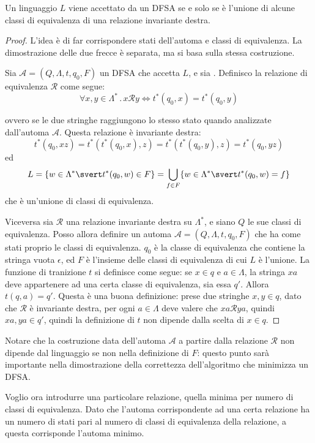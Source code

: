 \documentclass[12pt]{article}
\numberwithin{theorem}{subsection}
\begin{document}
\begin{theorem}\label{th:myhill-nerode}
	Un linguaggio $L$ viene accettato da un DFSA se e solo se è l'unione di alcune classi di equivalenza di una relazione invariante destra.
\end{theorem}
\begin{proof}
	L'idea è di far corrispondere stati dell'automa e classi di equivalenza. La dimostrazione delle due frecce è separata, ma si basa sulla stessa costruzione.
	
	Sia $\mathcal{A} = ( Q, \Lambda, t, q_0, F )$ un DFSA che accetta $L$, e sia . Definisco la relazione di equivalenza $\mathcal{R}$ come segue:
	\[
	\forall x, y \in \Lambda^* \,.\, x \mathcal{R} y \iff t^*(q_0, x) = t^*(q_0, y)
	\]
	
	ovvero se le due stringhe raggiungono lo stesso stato quando analizzate dall'automa $\mathcal{A}$. Questa relazione è invariante destra:
	\[
	t^*(q_0, xz) = t^*(t^*(q_0, x), z) = t^*(t^*(q_0, y), z) = t^*(q_0, yz)
	\]
	ed
	\[
	L = \lbrace w \in \Lambda^* \svert t^*(q_0, w) \in F \rbrace = \bigcup\limits_{f \in F} \lbrace w \in \Lambda^* \svert t^*(q_0, w) = f \rbrace
	\]
	che è un'unione di classi di equivalenza.
	
	Viceversa sia $\mathcal{R}$ una relazione invariante destra su $\Lambda^*$, e siano $Q$ le sue classi di equivalenza. Posso allora definire un automa $\mathcal{A} = (Q, \Lambda, t, q_0, F)$ che ha come stati proprio le classi di equivalenza. $q_0$ è la classe di equivalenza che contiene la stringa vuota $\epsilon$, ed $F$ è l'insieme delle classi di equivalenza di cui $L$ è l'unione. La funzione di tranizione $t$ si definisce come segue:
	se $x \in q$ e $a \in \Lambda$, la stringa $xa$ deve appartenere ad una certa classe di equivalenza, sia essa $q'$. Allora $t(q, a) = q'$. Questa è una buona definizione: prese due stringhe $x, y \in q$, dato che $\mathcal{R}$ è invariante destra, per ogni $a \in \Lambda$ deve valere che $xa \mathcal{R} ya$, quindi $xa, ya \in q'$, quindi la definizione di $t$ non dipende dalla scelta di $x \in q$.
\end{proof}

Notare che la costruzione data dell'automa $\mathcal{A}$ a partire dalla relazione $\mathcal{R}$ non dipende dal linguaggio se non nella definizione di $F$: questo punto sarà importante nella dimostrazione della correttezza dell'algoritmo che minimizza un DFSA.

Voglio ora introdurre una particolare relazione, quella minima per numero di classi di equivalenza. Dato che l'automa corrispondente ad una certa relazione ha un numero di stati pari al numero di classi di equivalenza della relazione, a questa corrisponde l'automa minimo.
\end{document}
